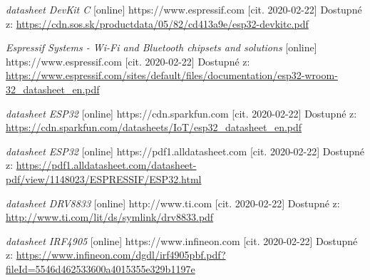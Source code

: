 \documentclass{template/socthesis}
\begin{document}
\begin{thebibliography}{1}
			
			\textit{datasheet DevKit C} [online] https://www.espressif.com [cit. 2020-02-22] Dostupné z:
			\url{https://cdn.sos.sk/productdata/05/82/cd413a9e/esp32-devkitc.pdf}
			
			\textit{Espressif Systems - Wi-Fi and Bluetooth chipsets and solutions } [online] https://www.espressif.com [cit. 2020-02-22] Dostupné z:
			\url{https://www.espressif.com/sites/default/files/documentation/esp32-wroom-32_datasheet_en.pdf}
			
			\textit{datasheet ESP32} [online] https://cdn.sparkfun.com [cit. 2020-02-22] Dostupné z:
			\url{https://cdn.sparkfun.com/datasheets/IoT/esp32_datasheet_en.pdf}
			
			\textit{datasheet ESP32} [online] https://pdf1.alldatasheet.com [cit. 2020-02-22] Dostupné z:
			\url{https://pdf1.alldatasheet.com/datasheet-pdf/view/1148023/ESPRESSIF/ESP32.html}
			
			
			\textit{datasheet DRV8833} [online] http://www.ti.com [cit. 2020-02-22] Dostupné z:
			\url{http://www.ti.com/lit/ds/symlink/drv8833.pdf}
			
			
			\textit{datasheet IRF4905} [online] https://www.infineon.com [cit. 2020-02-22] Dostupné z:
			\url{https://www.infineon.com/dgdl/irf4905pbf.pdf?fileId=5546d462533600a4015355e329b1197e}
			
			

\end{thebibliography}
\end{document}
